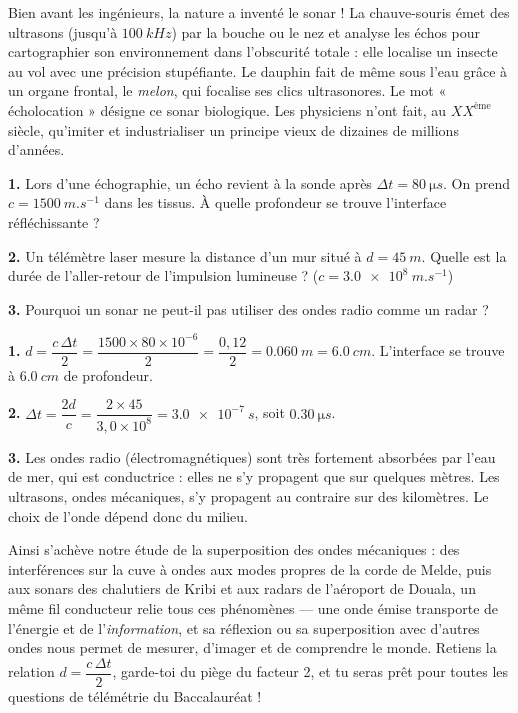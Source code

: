 \documentclass[11pt]{article}
\begin{document}
\begin{savaistu}
Bien avant les ingénieurs, la nature a inventé le sonar ! La chauve-souris émet des ultrasons (jusqu'à $\SI{100}{kHz}$) par la bouche ou le nez et analyse les échos pour cartographier son environnement dans l'obscurité totale : elle localise un insecte au vol avec une précision stupéfiante. Le dauphin fait de même sous l'eau grâce à un organe frontal, le \emph{melon}, qui focalise ses clics ultrasonores. Le mot « écholocation » désigne ce sonar biologique. Les physiciens n'ont fait, au $XX^{\text{ème}}$ siècle, qu'imiter et industrialiser un principe vieux de dizaines de millions d'années.
\end{savaistu}

\begin{exercice}
\textbf{1.} Lors d'une échographie, un écho revient à la sonde après $\Delta t = \SI{80}{\micro s}$. On prend $c = \SI{1500}{m.s^{-1}}$ dans les tissus. À quelle profondeur se trouve l'interface réfléchissante ?

\textbf{2.} Un télémètre laser mesure la distance d'un mur situé à $d = \SI{45}{m}$. Quelle est la durée de l'aller-retour de l'impulsion lumineuse ? ($c = \SI{3,0e8}{m.s^{-1}}$)

\textbf{3.} Pourquoi un sonar ne peut-il pas utiliser des ondes radio comme un radar ?
\end{exercice}

\begin{corrige}
\textbf{1.} $d = \dfrac{c\,\Delta t}{2} = \dfrac{1500\times 80\times 10^{-6}}{2} = \dfrac{0{,}12}{2} = \SI{0,060}{m} = \SI{6,0}{cm}$. L'interface se trouve à $\SI{6,0}{cm}$ de profondeur.

\textbf{2.} $\Delta t = \dfrac{2d}{c} = \dfrac{2\times 45}{3{,}0\times 10^{8}} = \SI{3,0e-7}{s}$, soit $\SI{0,30}{\micro s}$.

\textbf{3.} Les ondes radio (électromagnétiques) sont très fortement absorbées par l'eau de mer, qui est conductrice : elles ne s'y propagent que sur quelques mètres. Les ultrasons, ondes mécaniques, s'y propagent au contraire sur des kilomètres. Le choix de l'onde dépend donc du milieu.
\end{corrige}

Ainsi s'achève notre étude de la superposition des ondes mécaniques : des interférences sur la cuve à ondes aux modes propres de la corde de Melde, puis aux sonars des chalutiers de Kribi et aux radars de l'aéroport de Douala, un même fil conducteur relie tous ces phénomènes — une onde émise transporte de l'énergie et de l'\emph{information}, et sa réflexion ou sa superposition avec d'autres ondes nous permet de mesurer, d'imager et de comprendre le monde. Retiens la relation $d = \dfrac{c\,\Delta t}{2}$, garde-toi du piège du facteur 2, et tu seras prêt pour toutes les questions de télémétrie du Baccalauréat !
\end{document}
